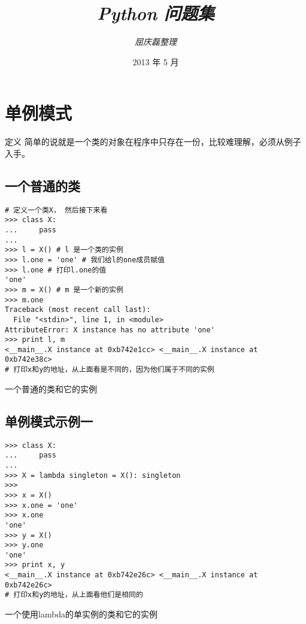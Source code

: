 \documentclass{article}
\begin{document}
\title{%
  {\huge \textit{Python 问题集}\\\smallskip}%
}

\author{\textit{屈庆磊整理} \\[3mm]
       }

\date{2013 年 5 月}

\maketitle

\begin{multicols}{2}
\tableofcontents
\end{multicols}

\section{单例模式}
\textsf{定义} 简单的说就是一个类的对象在程序中只存在一份，比较难理解，必须从例子入手。

\subsection{一个普通的类}
\begin{listing}[H]
\begin{verbatim}
# 定义一个类X， 然后接下来看
>>> class X:
...     pass
... 
>>> l = X() # l 是一个类的实例
>>> l.one = 'one' # 我们给l的one成员赋值
>>> l.one # 打印l.one的值
'one'
>>> m = X() # m 是一个新的实例
>>> m.one 
Traceback (most recent call last):
  File "<stdin>", line 1, in <module>
AttributeError: X instance has no attribute 'one'
>>> print l, m
<__main__.X instance at 0xb742e1cc> <__main__.X instance at 0xb742e38c>
# 打印x和y的地址，从上面看是不同的，因为他们属于不同的实例
\end{verbatim}
\label{normalClass}
\caption{一个普通的类和它的实例}
\end{listing}

\subsection{单例模式示例一}
\begin{listing}[H]
\begin{verbatim}
>>> class X:
...     pass
... 
>>> X = lambda singleton = X(): singleton
>>> 
>>> x = X()
>>> x.one = 'one'
>>> x.one
'one'
>>> y = X()
>>> y.one
'one'
>>> print x, y
<__main__.X instance at 0xb742e26c> <__main__.X instance at 0xb742e26c>
# 打印x和y的地址，从上面看他们是相同的
\end{verbatim}
\label{singleton}
\caption{一个使用lambda的单实例的类和它的实例}
\end{listing}
\end{document}
